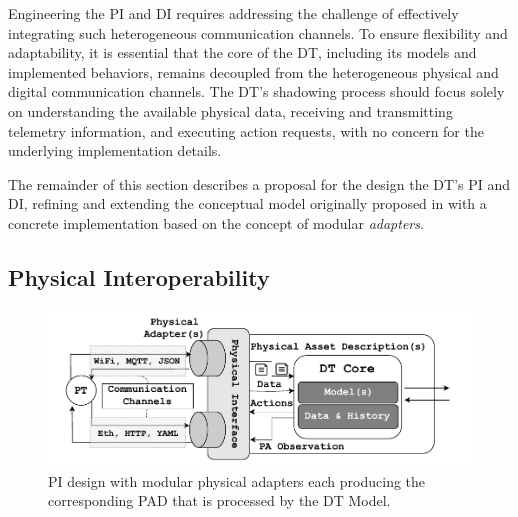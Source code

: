 Engineering the \ac{PI} and \ac{DI} requires addressing the challenge of effectively integrating such heterogeneous communication channels.
%
To ensure flexibility and adaptability, it is essential that the core of the \ac{DT}, including its models and implemented behaviors, remains decoupled from the heterogeneous physical and digital communication channels.
%
The \ac{DT}'s shadowing process should focus solely on understanding the available physical data, receiving and transmitting telemetry information, and executing action requests, with no concern for the underlying implementation details.

The remainder of this section describes a proposal for the design the \ac{DT}'s \ac{PI} and \ac{DI}, refining and extending the conceptual model originally proposed in \cite{web-of-dt-ricci-2022} with a concrete implementation based on the concept of modular \emph{adapters}.

\subsection{Physical Interoperability}
\label{ssec:dte:dt-engineering:physical_interoperability}

\begin{figure}
    \centering
    \includegraphics[width=\columnwidth]{figures/dt-interoperability/dt_interoperability_physical.pdf}
    \caption{PI design with modular physical adapters each producing the corresponding \acl{PAD} that is processed by the \ac{DT} Model.}
    \label{fig:physical_interoperability}
\end{figure}


